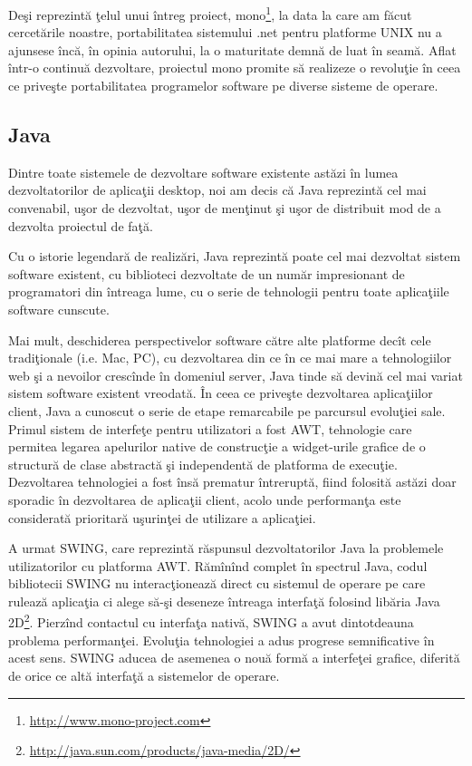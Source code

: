 Deşi reprezintă ţelul unui întreg proiect, 
mono\footnote{\url{http://www.mono-project.com}}, la data la care am făcut 
cercetările noastre, portabilitatea sistemului .net pentru platforme UNIX nu a 
ajunsese încă, în opinia autorului, la o maturitate demnă de luat în seamă. 
Aflat într-o continuă dezvoltare, proiectul mono promite să realizeze o 
revoluţie în ceea ce priveşte portabilitatea programelor software pe diverse 
sisteme de operare.

\subsection{Java}

Dintre toate sistemele de dezvoltare software existente astăzi în lumea 
dezvoltatorilor de aplicaţii desktop, noi am decis că Java reprezintă cel mai 
convenabil, uşor de dezvoltat, uşor de menţinut şi uşor de distribuit mod de a 
dezvolta proiectul de faţă.

Cu o istorie legendară de realizări, Java reprezintă poate cel mai dezvoltat 
sistem software existent, cu biblioteci dezvoltate de un număr impresionant de 
programatori din întreaga lume, cu o serie de tehnologii pentru toate 
aplicaţiile software cunscute.

Mai mult, deschiderea perspectivelor software către alte platforme decît cele 
tradiţionale (i.e. Mac, PC), cu dezvoltarea din ce în ce mai mare a 
tehnologiilor web şi a nevoilor crescînde în domeniul server, Java tinde să 
devină cel mai variat sistem software existent vreodată. În ceea ce priveşte 
dezvoltarea aplicaţiilor client, Java a cunoscut o serie de etape remarcabile 
pe parcursul evoluţiei sale. Primul sistem de interfeţe pentru utilizatori a 
fost AWT, tehnologie care permitea legarea apelurilor native de construcţie a 
widget-urile grafice de o structură de clase abstractă şi independentă de 
platforma de execuţie. Dezvoltarea tehnologiei a fost însă prematur întreruptă, 
fiind folosită astăzi doar sporadic în dezvoltarea de aplicaţii client, acolo 
unde performanţa este considerată prioritară uşurinţei de utilizare a 
aplicaţiei.

A urmat SWING, care reprezintă răspunsul dezvoltatorilor Java la problemele 
utilizatorilor cu platforma AWT. Rămînînd complet în spectrul Java, codul 
bibliotecii SWING nu interacţionează direct cu sistemul de operare pe care 
rulează aplicaţia ci alege să-şi deseneze întreaga interfaţă folosind libăria 
Java 2D\footnote{\url{http://java.sun.com/products/java-media/2D/}}. Pierzînd 
contactul cu interfaţa nativă, SWING a avut dintotdeauna problema performanţei. 
Evoluţia tehnologiei a adus progrese semnificative în acest sens. SWING aducea 
de asemenea o nouă formă a interfeţei grafice, diferită de orice ce altă 
interfaţă a sistemelor de operare.

